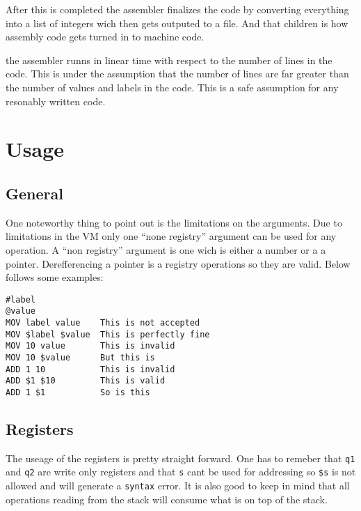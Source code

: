 \documentclass{article}
\newcommand{\V}{\verb}
\begin{document}
After this is completed the assembler finalizes the code by converting
everything into a list of integers wich then gets outputed to a file. And that
children is how assembly code gets turned in to machine code.

the assembler runns in linear time with respect to the number of lines in the
code. This is under the assumption that the number of lines are far greater than
the number of values and labels in the code. This is a safe assumption for any
resonably written code.

\section{Usage}
\subsection{General}
One noteworthy thing to point out is the limitations on the arguments. Due to
limitations in the VM only one ``none registry'' argument can be used for any
operation. A ``non registry'' argument is one wich is either a number or a
a pointer. Derefferencing a pointer is a registry operations so they are valid.
Below follows some examples:
\begin{verbatim}
#label
@value
MOV label value    This is not accepted
MOV $label $value  This is perfectly fine
MOV 10 value       This is invalid
MOV 10 $value      But this is
ADD 1 10           This is invalid
ADD $1 $10         This is valid
ADD 1 $1           So is this
\end{verbatim}

\subsection{Registers}
The useage of the registers is pretty straight forward. One has to remeber that
\V+q1+ and \V+q2+ are write only registers and that \V+s+ cant be used for
addressing so \verb+$s+ is not allowed and will generate a \verb+syntax+ error.
It is also good to keep in mind that all operations reading from the stack will
consume what is on top of the stack.
\end{document}
